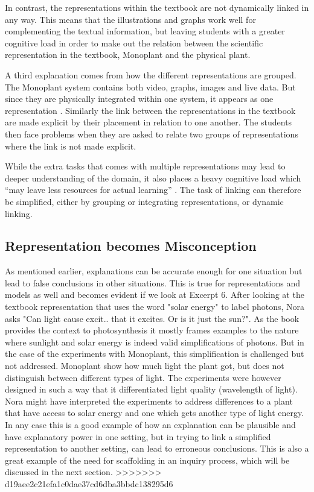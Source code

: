 In contrast, the representations within the textbook are not dynamically linked in any way. This means that the illustrations and graphs work well for complementing the textual information, but leaving students with a greater cognitive load in order to make out the relation between the scientific representation in the textbook, Monoplant and the physical plant. 

A third explanation comes from how the different representations are grouped. The Monoplant system contains both video, graphs, images and live data. But since they are physically integrated within one system, it appears as one representation \citep{van2006supporting}. Similarly the link between the representations in the textbook are made explicit by their placement in relation to one another. The students then face problems when they are asked to relate two groups of representations where the link is not made explicit. 

While the extra tasks that comes with multiple representations may lead to deeper understanding of the domain, it also places a heavy cognitive load which “may leave less resources for actual learning” \citetext{Sweller, 1988, 1989, referenced in \citealp{van2006supporting}}. The task of linking can therefore be simplified, either by grouping or integrating representations, or dynamic linking. 

\subsection{Representation becomes Misconception}
As mentioned earlier, explanations can be accurate enough for one situation but lead to false conclusions in other situations. \citep{smith1994misconceptions} This is true for representations and models as well and becomes evident if we look at Excerpt 6. After looking at the textbook representation that uses the word "solar energy" to label photons, Nora asks "Can light cause excit.. that it excites. Or is it just the sun?". As the book provides the context to photosynthesis it mostly frames examples to the nature where sunlight and solar energy is indeed valid simplifications of photons. But in the case of the experiments with Monoplant, this simplification is challenged but not addressed. Monoplant show how much light the plant got, but does not distinguish between different types of light. The experiments were however designed in such a way that it differentiated light quality (wavelength of light). Nora might have interpreted the experiments to address differences to a plant that have access to solar energy and one which gets another type of light energy. In any case this is a good example of how an explanation can be plausible and have explanatory power in one setting, but in trying to link a simplified representation to another  setting, can lead to erroneous conclusions. This is also a great example of the need for scaffolding in an inquiry process, which will be discussed in the next section.
>>>>>>> d19aee2c21efa1c0dae37cd6dba3bbdc138295d6



